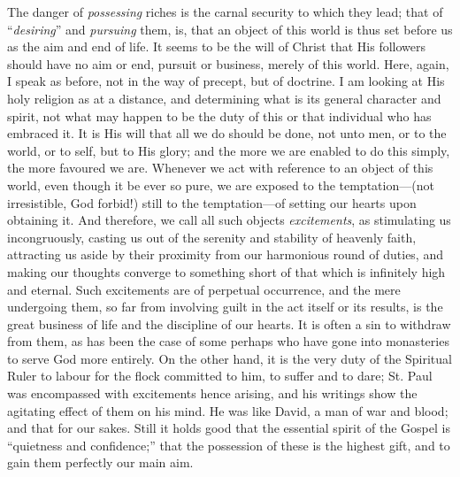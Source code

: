The danger of \emph{possessing} riches is the carnal security to
which they lead; that of ``\emph{desiring}'' and \emph{pursuing}
them, is, that an object of this world is thus set before us as the aim
and end of life. It seems to be the will of Christ that His followers
should have no aim or end, pursuit or business, merely of this world.
Here, again, I speak as before, not in the way of precept, but of
doctrine. I am looking at His holy religion as at a distance, and
determining what is its general character and spirit, not what may
happen to be the duty of this or that individual who has embraced it. It
is His will that all we do should be done, not unto men, or to the
world, or to self, but to His glory; and the more we are enabled to do
this simply, the more favoured we are. Whenever we act with reference to
an object of this world, even though it be ever so pure, we are exposed
to the temptation—(not irresistible, God forbid!) still to the
temptation—of setting our hearts upon obtaining it. And therefore, we
call all such objects \emph{excitements}, as stimulating us
incongruously, casting us out of the serenity and stability of heavenly
faith, attracting us aside by their proximity from our harmonious round
of duties, and making our thoughts converge to something short of that
which is infinitely high and eternal. Such excitements are of perpetual
occurrence, and the mere undergoing them, so far from involving guilt in
the act itself or its results, is the great business of life and the
discipline of our hearts. It is often a sin to withdraw from them, as
has been the case of some perhaps who have gone into monasteries to
serve God more entirely. On the other hand, it is the very duty of the
Spiritual Ruler to labour for the flock committed to him, to suffer and
to dare; St. Paul was encompassed with excitements hence arising, and
his writings show the agitating effect of them on his mind. He was like
David, a man of war and blood; and that for our sakes. Still it holds
good that the essential spirit of the Gospel is ``quietness and
confidence;'' that the possession of these is the highest gift, and
to gain them perfectly our main aim.

